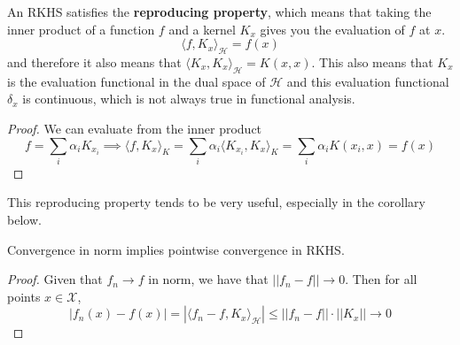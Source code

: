 \documentclass{article}
\begin{document}
    \begin{theorem}
      An RKHS satisfies the \textbf{reproducing property}, which means that taking the inner product of a function $f$ and a kernel $K_x$ gives you the evaluation of $f$ at $x$. 
      \begin{equation}
        \langle f, K_x \rangle_{\mathcal{H}} = f(x)
      \end{equation}
      and therefore it also means that $\langle K_x, K_x \rangle_{\mathcal{H}} = K(x, x)$. This also means that $K_x$ is the evaluation functional in the dual space of $\mathcal{H}$ and this evaluation functional $\delta_x$ is continuous, which is not always true in functional analysis.  
    \end{theorem}
    \begin{proof}
      We can evaluate from the inner product 
      \begin{equation}
        f = \sum_i \alpha_i K_{x_i} \implies \langle f, K_x \rangle_K = \sum_i \alpha_i \langle K_{x_i}, K_x \rangle_K = \sum_i \alpha_i K(x_i, x) = f(x)
      \end{equation}
    \end{proof}

    This reproducing property tends to be very useful, especially in the corollary below. 

    \begin{corollary}
      Convergence in norm implies pointwise convergence in RKHS. 
    \end{corollary}
    \begin{proof}
      Given that $f_n \rightarrow f$ in norm, we have that $||f_n - f|| \rightarrow 0$. Then for all points $x \in \mathcal{X}$, 
      \begin{equation}
        |f_n(x) - f(x)| = |\langle f_n - f, K_x \rangle_{\mathcal{H}}| \leq ||f_n - f|| \cdot ||K_x|| \rightarrow 0
      \end{equation}
    \end{proof}
\end{document}
